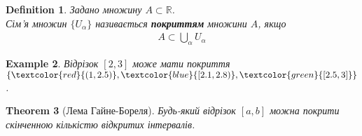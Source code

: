 \documentclass[a4paper, 14pt]{article}
\theoremstyle{theoremdd}
\newtheorem{theorem}{Theorem}[subsection]
\theoremstyle{theoremdd}
\newtheorem{definition}[theorem]{Definition}
\theoremstyle{theoremdd}
\theoremstyle{theoremdd}
\newtheorem{example}[theorem]{Example}
\theoremstyle{theoremdd}
\theoremstyle{theoremdd}
\theoremstyle{theoremdd}
\theoremstyle{theoremdd}
\begin{document}
	\begin{definition}
	Задано множину $A \subset \mathbb{R}$.\\
	Сім'я множин $\{U_{\alpha}\}$ називається \textbf{покриттям} множини $A$, якщо
	\begin{align*}
	A \subset \bigcup_{\alpha} U_{\alpha}
	\end{align*}
	\end{definition}
	
	\begin{example}
	Відрізок $[2,3]$ може мати покриття $\{\textcolor{red}{(1,2.5)}, \textcolor{blue}{[2.1,2.8)}, \textcolor{green}{[2.5,3]}\}$.
	\begin{figure}[H]
	\centering
	\end{figure}
	\end{example}
	
	\begin{theorem}[Лема Гайне-Бореля]
	Будь-який відрізок $[a,b]$ можна покрити скінченною кількістю відкритих інтервалів.
	\iffalse Така множина, що має властивість 'із відкритого покриття взяти скінченне підпокриття', називається компактом. Тобто $[a,b]$ -- це компакт. \fi
	\end{theorem}
	
\end{document}
